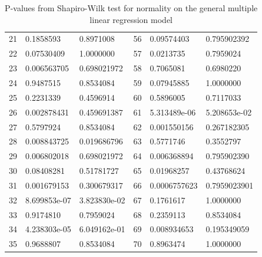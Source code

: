 \begin{table}[H]
\begin{tabular}{c:ll|c:ll}
        21 & 0.1858593 &0.8971008 & 56 & 0.09574403 &0.795902392\\ 
        22 & 0.07530409 &1.0000000 & 57 & 0.0213735& 0.7959024\\ 
        23 & 0.006563705 & 0.698021972 & 58 & 0.7065081 &0.6980220\\ 
        24 & 0.9487515 & 0.8534084 & 59 & 0.07945885 &1.0000000\\ 
        25 & 0.2231339 & 0.4596914 & 60 & 0.5896005 &0.7117033\\ 
        26 & 0.002878431 & 0.459691387 & 61 & 5.313489e-06 &5.208653e-02\\
        27 &0.5797924 &0.8534084 & 62 & 0.001550156 &0.267182305\\ 
        28 & 0.008843725 &0.019686796 & 63 & 0.5771746 &0.3552797\\ 
        29 & 0.006802018 &0.698021972 & 64 & 0.006368894 &0.795902390\\ 
        30 & 0.08408281 &0.51781727 & 65 & 0.01968257 &0.43768624\\ 
        31 & 0.001679153 &0.300679317 & 66 & 0.0006757623 &0.7959023901\\ 
        32 & 8.699853e-07 & 3.823830e-02 & 67 & 0.1761617 &1.0000000\\ 
        33 & 0.9174810 &0.7959024 & 68 & 0.2359113 &0.8534084\\ 
        34 & 4.238303e-05 &6.049162e-01 & 69 & 0.008934653 &0.195349059\\
        35 & 0.9688807 &0.8534084 & 70 & 0.8963474 &1.0000000 \\
        \hline
    \end{tabular}
    \caption{P-values from Shapiro-Wilk test for normality on the general multiple linear regression model}
    \label{tab: shapiro_multiple_lm}
\end{table}

